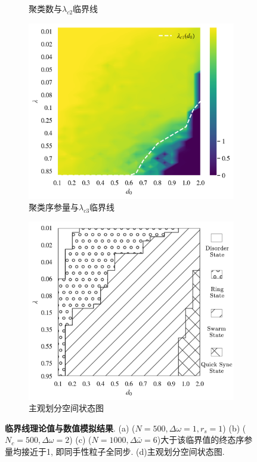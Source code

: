 \documentclass{article}
\begin{document}
\begin{figure}[H]
\begin{subfigure}[b]{0.49\textwidth}
		\vspace{-1cm}
		\caption{聚类数与$\lambda_{c2}$临界线}
	\end{subfigure}
	\begin{subfigure}[b]{0.49\textwidth}
		\includegraphics[width=\textwidth]{./figs/circleSwarmEdgesCounts.png}
		\vspace{-1cm}
		\caption{聚类序参量与$\lambda_{c3}$临界线}
	\end{subfigure}
	\begin{subfigure}[b]{0.49\textwidth}
		\includegraphics[width=\textwidth]{./figs/subjectiveOp3.png}
		\vspace{-1cm}
		\caption{主观划分空间状态图}
	\end{subfigure}
	\vspace{-0.3cm}
	\caption{\small\textbf{临界线理论值与数值模拟结果}. (a) ($N=500, \Delta \omega=1, r_s=1$) (b) ($N_c=500, \Delta \omega=2$) (c) ($N=1000, \Delta \bar{\omega}=6$)大于该临界值的终态序参量均接近于1, 即同手性粒子全同步. (d)主观划分空间状态图.}
	\label{fig:fig23.3}
\end{figure}
\end{document}
